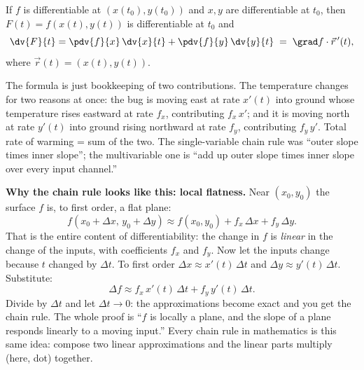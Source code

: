\begin{theorem}
\label{ch33:thm-chain1}
If $f$ is differentiable at $(x(t_0),y(t_0))$ and $x,y$ are differentiable at
$t_0$, then $F(t)=f(x(t),y(t))$ is differentiable at $t_0$ and
\[
  \dv{F}{t} = \pdv{f}{x}\,\dv{x}{t} + \pdv{f}{y}\,\dv{y}{t}
  \;=\; \grad f \cdot \vec r\,'(t),
\]
where $\vec r(t)=(x(t),y(t))$.
\end{theorem}

\begin{intuitionbox}
The formula is just bookkeeping of two contributions. The temperature changes for
two reasons at once: the bug is moving east at rate $x'(t)$ into ground whose
temperature rises eastward at rate $f_x$, contributing $f_x\,x'$; and it is moving
north at rate $y'(t)$ into ground rising northward at rate $f_y$, contributing
$f_y\,y'$. Total rate of warming = sum of the two. The single-variable chain rule
was ``outer slope times inner slope''; the multivariable one is ``add up outer
slope times inner slope over every input channel.''
\end{intuitionbox}

\begin{whybox}
\textbf{Why the chain rule looks like this: local flatness.} Near $(x_0,y_0)$ the
surface $f$ is, to first order, a flat plane:
\[
  f(x_0+\Delta x,\, y_0+\Delta y) \approx f(x_0,y_0)
  + f_x\,\Delta x + f_y\,\Delta y.
\]
That is the entire content of differentiability: the change in $f$ is
\emph{linear} in the change of the inputs, with coefficients $f_x$ and $f_y$. Now
let the inputs change because $t$ changed by $\Delta t$. To first order
$\Delta x \approx x'(t)\,\Delta t$ and $\Delta y \approx y'(t)\,\Delta t$.
Substitute:
\[
  \Delta f \approx f_x\,x'(t)\,\Delta t + f_y\,y'(t)\,\Delta t.
\]
Divide by $\Delta t$ and let $\Delta t \to 0$: the approximations become exact and
you get the chain rule. The whole proof is ``$f$ is locally a plane, and the slope
of a plane responds linearly to a moving input.'' Every chain rule in mathematics
is this same idea: compose two linear approximations and the linear parts
multiply (here, dot) together.
\end{whybox}

